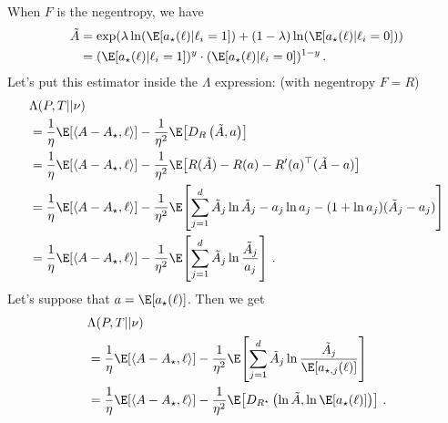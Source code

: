When $F$ is the negentropy, we have
\begin{align*}
    \tilde{A} & =
    \exp\!\left(
    \lambda \ln(\E[a_\star(\ell) | \ell_i = 1])
    + (1 - \lambda) \ln(\E[a_\star(\ell) | \ell_i = 0])
    \right)       \\
              & =
    (\E[a_\star(\ell) | \ell_i = 1])^y
    \cdot (\E[a_\star(\ell) | \ell_i = 0])^{1 - y}\,.
\end{align*}
Let's put this estimator inside the $\Lambda$ expression: (with negentropy $F=R$)
\begin{align*}
     & \Lambda(P, T || \nu) \\
     & =
    \frac{1}{\eta}
    \E\!\left[
        \langle A - A_\star, \ell \rangle
        \right]
    - \frac{1}{\eta^2}
    \E\!\left[
        D_R\left(\tilde{A}, a\right)
    \right]                 \\
     & =
    \frac{1}{\eta}
    \E\!\left[
        \langle A - A_\star, \ell \rangle
        \right]
    - \frac{1}{\eta^2}
    \E\!\left[
        R(\tilde{A}) - R(a) - R'(a)^\top (\tilde{A} - a)
    \right]                 \\
     & =
    \frac{1}{\eta}
    \E\!\left[
        \langle A - A_\star, \ell \rangle
        \right]
    - \frac{1}{\eta^2}
    \E\!\left[
        \sum_{j=1}^d \tilde{A}_j \ln \tilde{A}_j
        - a_j \ln a_j
        - (1 + \ln a_j)(\tilde{A}_j - a_j)
    \right]                 \\
     & =
    \frac{1}{\eta}
    \E\!\left[
        \langle A - A_\star, \ell \rangle
        \right]
    - \frac{1}{\eta^2}
    \E\!\left[
        \sum_{j=1}^d \tilde{A}_j \ln \frac{\tilde{A}_j}{a_j}
        \right]\,.
\end{align*}
Let's suppose that $a = \E[a_\star(\ell)]$.
Then we get
\begin{align*}
     & \Lambda(P, T || \nu) \\
     & =
    \frac{1}{\eta}
    \E\!\left[
        \langle A - A_\star, \ell \rangle
        \right]
    - \frac{1}{\eta^2}
    \E\!\left[
        \sum_{j=1}^d \tilde{A}_j \ln \frac{\tilde{A}_j}{\E[a_{\star,j}(\ell)]}
    \right]                 \\
     & =
    \frac{1}{\eta}
    \E\!\left[
        \langle A - A_\star, \ell \rangle
        \right]
    - \frac{1}{\eta^2}
    \E\!\left[
        D_{R^\star}\left(
        \ln \tilde{A},
        \ln \E[a_\star(\ell)]
        \right)
        \right]\,.
\end{align*}